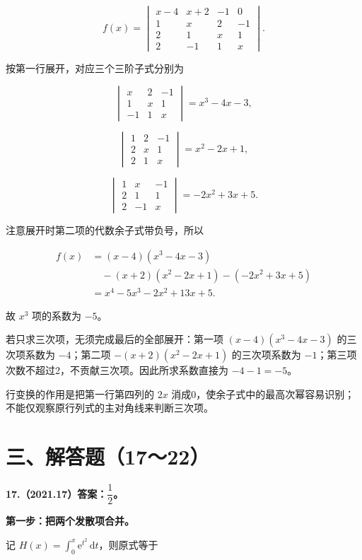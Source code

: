 \documentclass[UTF8,11pt,fontset=windows]{ctexart}
\begin{document}
$$
f(x)=\begin{vmatrix}
x-4&x+2&-1&0\\
1&x&2&-1\\
2&1&x&1\\
2&-1&1&x
\end{vmatrix}.
$$

按第一行展开，对应三个三阶子式分别为

$$
\begin{vmatrix}x&2&-1\\1&x&1\\-1&1&x\end{vmatrix}=x^3-4x-3,
$$

$$
\begin{vmatrix}1&2&-1\\2&x&1\\2&1&x\end{vmatrix}=x^2-2x+1,
$$

$$
\begin{vmatrix}1&x&-1\\2&1&1\\2&-1&x\end{vmatrix}=-2x^2+3x+5.
$$

注意展开时第二项的代数余子式带负号，所以

$$
\begin{aligned}
f(x)&=(x-4)(x^3-4x-3)\\
&\quad-(x+2)(x^2-2x+1)-(-2x^2+3x+5)\\
&=x^4-5x^3-2x^2+13x+5.
\end{aligned}
$$

故 $x^3$ 项的系数为 $-5$。

若只求三次项，无须完成最后的全部展开：第一项 $(x-4)(x^3-4x-3)$ 的三次项系数为 $-4$；第二项 $-(x+2)(x^2-2x+1)$ 的三次项系数为 $-1$；第三项次数不超过2，不贡献三次项。因此所求系数直接为 $-4-1=-5$。

行变换的作用是把第一行第四列的 $2x$ 消成0，使余子式中的最高次幂容易识别；不能仅观察原行列式的主对角线来判断三次项。

\clearpage

\section*{三、解答题（17～22）}

\textbf{17.（2021.17）答案：$\dfrac12$。}

\textbf{第一步：把两个发散项合并。}

记 $H(x)=\int_0^x\mathrm e^{t^2}\,\mathrm dt$，则原式等于
\end{document}

